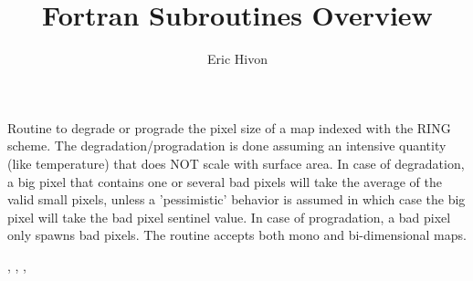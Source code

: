 
\sloppy


\title{\healpix Fortran Subroutines Overview}
 \section[udgrade\_ring*]{ }
\label{sub:udgrade_ring}
\author{Eric Hivon}


\begin{facility}
{Routine to degrade or prograde the pixel size of a \healpix map indexed with
  the RING scheme. The degradation/progradation is done assuming an
intensive quantity (like temperature) that does NOT scale with surface area. \newline
In case of degradation, a big pixel that contains one or several bad pixels will
take the average of the valid small pixels, unless a 'pessimistic' behavior
is assumed in which case the big pixel will take the bad pixel sentinel value.
In case of progradation, a bad pixel only spawns bad pixels.\newline
The routine accepts both mono and bi-dimensional maps.
}
{\modUdgradeNr}
\end{facility}

\begin{f90format}
{%
, %
, %
, %
 }
\end{f90format}
\aboutoptional

